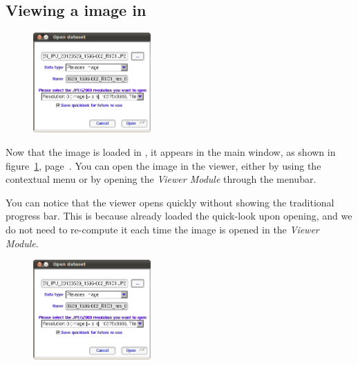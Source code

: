 \subsection{Viewing a \phr image in \mont}

\begin{figure}
  \center
  \includegraphics[width=0.4\textwidth]{../Art/MonteverdiImages/pleiades_open.png}
  \label{fig:pleiades_monteverdi}
\end{figure}

Now that the \phr image is loaded in \mont, it appears in the
main \mont window, as shown in figure~\ref{fig:pleiades_monteverdi},
page~\pageref{fig:pleiades_monteverdi}. You can open the \phr image in
the viewer, either by using the contextual menu or by opening
the \textit{Viewer Module} through the menubar.

You can notice that the viewer opens quickly without showing the
traditional progress bar. This is because \mont already loaded the
quick-look upon opening, and we do not need to re-compute it each time
the image is opened in the \textit{Viewer Module}. 

\begin{figure}
  \center
  \includegraphics[width=0.4\textwidth]{../Art/MonteverdiImages/pleiades_open.png}
  \label{fig:pleiades_viewer}
\end{figure}

